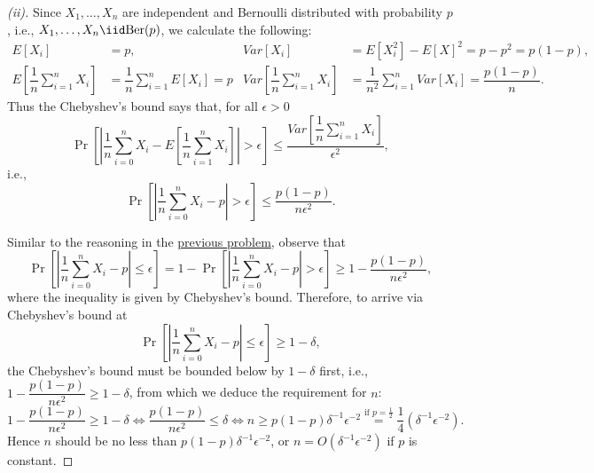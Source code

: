 \begin{proof}[(ii)]
    Since $X_1,\ldots, X_n$ are independent and Bernoulli distributed with probability $p$, i.e., $X_1,\ldots, X_n\iid \mathrm{Ber}(p)$, we calculate the following:
    \begin{align*}
        E[X_i]&=p, & Var[X_i]&=E[X_i^2]-E[X]^2 = p-p^2=p(1-p),\\
        E\left[\dfrac{1}{n}\sum_{i=1}^n X_i\right]&=\dfrac{1}{n}\sum_{i=1}^nE[X_i]=p & Var\left[\dfrac{1}{n}\sum_{i=1}^n X_i\right]&=\dfrac{1}{n^2}\sum_{i=1}^n Var[X_i]=\dfrac{p(1-p)}{n}.
    \end{align*}
    Thus the Chebyshev’s bound says that, for all $\epsilon\gt 0$
    \[
    \Pr\left[\left|\frac{1}{n} \sum_{i=0}^n X_i - E\left[\dfrac{1}{n}\sum_{i=1}^n X_i\right]\right| \gt \epsilon\right]  \le \dfrac{Var\left[\dfrac{1}{n}\sum_{i=1}^n X_i\right]}{\epsilon^2},
    \] 
    i.e.,
    \[
    \Pr\left[\left|\frac{1}{n} \sum_{i=0}^n X_i - p\right| \gt \epsilon\right]  \le \dfrac{p(1-p)}{n\epsilon^2}.
    \]
    
    Similar to the reasoning in the \hyperref[pf:2-i]{previous problem}, observe that
    \[
    \Pr\left[\left|\frac{1}{n} \sum_{i=0}^n X_i - p\right| \le \epsilon\right] 
    =1-\Pr\left[\left|\frac{1}{n} \sum_{i=0}^n X_i - p\right| \gt \epsilon\right] 
    \ge 1- \dfrac{p(1-p)}{n\epsilon^2},
    \]
    where the inequality is given by Chebyshev’s bound. Therefore, to arrive via Chebyshev’s bound at
    \[
    \Pr\left[\left|\frac{1}{n} \sum_{i=0}^n X_i - p\right| \le \epsilon\right] 
    \ge 1-\delta, 
    \]
    the Chebyshev’s bound must be bounded below by $1-\delta$ first, i.e., $ 1- \dfrac{p(1-p)}{n\epsilon^2} \ge 1-\delta$, from which we deduce the requirement for $n$:
    \[
    1- \dfrac{p(1-p)}{n\epsilon^2} \ge 1-\delta
    \iff \dfrac{p(1-p)}{n\epsilon^2} \le \delta
    \iff n\ge p(1-p)\delta^{-1}\epsilon^{-2}
    \stackrel{\textrm{if }p=\frac{1}{2}}{=} \dfrac{1}{4}(\delta^{-1}\epsilon^{-2}).
    \]
    Hence $n$ should be no less than $ p(1-p)\delta^{-1}\epsilon^{-2}$, or $n=O(\delta^{-1}\epsilon^{-2})$ if $p$ is constant.


\end{proof}
